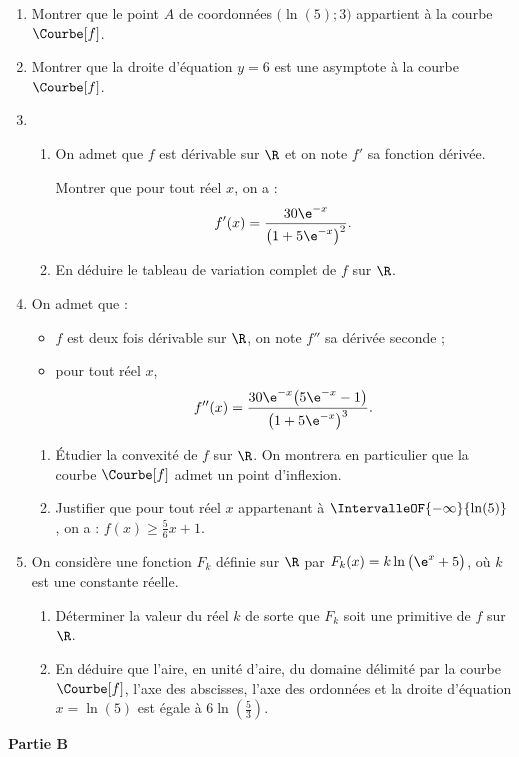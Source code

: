 \begin{enumerate}
	\item Montrer que le point $A$ de coordonnées $\big(\ln(5);3\big)$ appartient à la courbe $\Courbe[f]$.
	\item Montrer que la droite d'équation $y=6$ est une asymptote à la courbe $\Courbe[f]$.
	\item 
	\begin{enumerate}
		\item On admet que $f$ est dérivable sur $\R$ et on note $f'$ sa fonction dérivée.
		
		Montrer que pour tout réel $x$, on a : \[ f'(x) = \frac{30 \e^{-x}}{\big(1 + 5 \e^{-x}\big)^2}. \]
		\item En déduire le tableau de variation complet de $f$ sur $\R$.
	\end{enumerate}
	\item On admet que :
	
	\begin{itemize}
		\item $f$ est deux fois dérivable sur $\R$, on note $f''$ sa dérivée seconde ;
		\item pour tout réel $x$, \[ f''(x) = \frac{30 \e^{-x} \big(5 \e^{-x} - 1\big)}{\big(1 + 5 \e^{-x}\big)^3}. \]
	\end{itemize}
	\begin{enumerate}
		\item Étudier la convexité de $f$ sur $\R$. On montrera en particulier que la courbe $\Courbe[f]$ admet un point d'inflexion.
		\item Justifier que pour tout réel $x$ appartenant à $\IntervalleOF{-\infty}{\ln(5)} $, on a : $f(x) \geqslant \frac{5}{6} x + 1$.
	\end{enumerate}
	\item On considère une fonction $F_k$ définie sur $\R$ par $F_k(x) = k \ln\big(\e^x + 5\big)$, où $k$ est une constante réelle.
	\begin{enumerate}
		\item Déterminer la valeur du réel $k$ de sorte que $F_k$ soit une primitive de $f$ sur $\R$.
		\item En déduire que l'aire, en unité d'aire, du domaine délimité par la courbe $\Courbe[f]$, l'axe des abscisses, l'axe des ordonnées et la droite d'équation $x = \ln(5)$ est égale à $6 \ln\left(\frac{5}{3}\right)$.
	\end{enumerate}
\end{enumerate}

\begin{Centrage}
	\textbf{Partie B}
\end{Centrage}

